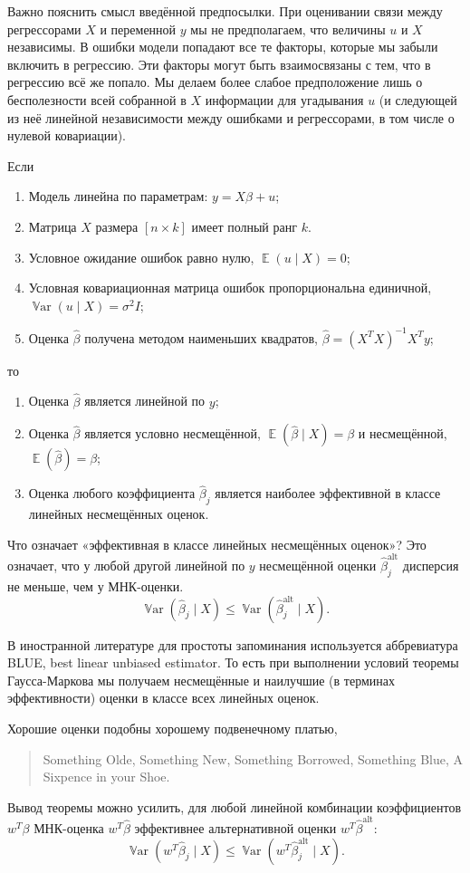 \documentclass[12pt]{article}
\DeclareMathOperator{\Var}{\mathbb{V}ar}
\DeclareMathOperator{\E}{\mathbb{E}}
\newcommand{\hb}{\hat{\beta}}
\newcommand{\alt}{\text{alt}}
\newcommand{\gaussmarkov}{
\begin{enumerate}[label=\arabic*.]
    \item Модель линейна по параметрам: $y = X\beta + u$;
    \item Матрица $X$ размера $[n \times k]$ имеет полный ранг $k$.
    \item Условное ожидание ошибок равно нулю, $\E(u\mid X) = 0$;
    \item Условная ковариационная матрица ошибок пропорциональна единичной, $\Var(u\mid X) = \sigma^2 I$;
    \item Оценка $\hb$ получена методом наименьших квадратов, $\hb = (X^T X)^{-1}X^T y$;
\end{enumerate}}
\begin{document}
Важно пояснить смысл введённой предпосылки. При оценивании связи между регрессорами $X$ и переменной $y$ мы не предполагаем, что величины $u$ и $X$ независимы. В ошибки модели попадают все те факторы, которые мы забыли включить в регрессию. Эти факторы могут быть взаимосвязаны с тем, что в регрессию всё же попало. Мы делаем более слабое предположение лишь о бесполезности всей собранной в $X$ информации для угадывания $u$ (и следующей из неё линейной независимости между ошибками и регрессорами, в том числе о нулевой ковариации).

\begin{theorem}
Если 
\gaussmarkov
то
\begin{enumerate}[label=(\alph*)]
    \item Оценка $\hb$ является линейной по $y$;
    \item Оценка $\hb$ является условно несмещённой, $\E(\hb \mid X) = \beta$ и несмещённой, $\E(\hb) = \beta$;
    \item Оценка любого коэффициента $\hb_j$ является наиболее эффективной в классе линейных несмещённых оценок. 
\end{enumerate}
\end{theorem}

Что означает «эффективная в классе линейных несмещённых оценок»?
Это означает, что у любой другой линейной по $y$ несмещённой оценки $\hb^{\alt}_j$ дисперсия не меньше, чем у МНК-оценки.
\[
\Var(\hb_j \mid X) \leq \Var(\hb^{\alt}_j \mid X).
\]



В иностранной литературе для простоты запоминания используется аббревиатура BLUE, best linear unbiased estimator. 
То есть при выполнении условий теоремы Гаусса-Маркова мы получаем несмещённые и наилучшие (в терминах эффективности) оценки в классе всех линейных оценок.

Хорошие оценки подобны хорошему подвенечному платью,
\begin{quotation}
Something Olde, Something New, Something Borrowed, Something Blue, A Sixpence in your Shoe.    
\end{quotation}


Вывод теоремы можно усилить, для любой линейной комбинации коэффициентов $w^T \beta$ МНК-оценка $w^T \hb$ эффективнее альтернативной оценки $w^T \hb^{\alt}$:
\[
\Var(w^T\hb_j \mid X) \leq \Var(w^T \hb^{\alt}_j \mid X).
\]
\end{document}
